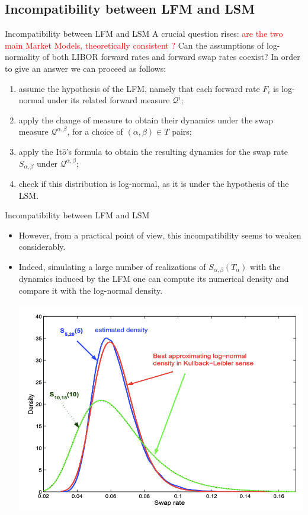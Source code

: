 \documentclass{beamer}
\begin{document}
\subsection{Incompatibility between LFM and LSM}
\begin{frame}{Incompatibility between LFM and LSM}
  A crucial question rises: \textcolor{red}{are the two main Market Models, theoretically consistent ?} 
  Can the assumptions of log-normality of both LIBOR forward rates and forward swap rates coexist? 
  \pause
  In order to give an answer we can proceed as follows:
  \begin{enumerate}
  \item<2-> assume the hypothesis of the LFM, namely that each forward rate $F_i$ is log-normal under its related forward measure $\mathcal{Q}^i$;
  \item<3-> apply the change of measure to obtain their dynamics under the swap measure $\mathcal{Q}^{\alpha,\beta}$, for a choice of $(\alpha,\beta) \in T$ pairs;
  \item<4-> apply the It$\hat{o}$’s formula to obtain the resulting dynamics for the swap rate $S_{\alpha,\beta}$ under $\mathcal{Q}^{\alpha,\beta}$;
  \item<5-> check if this distribution is log-normal, as it is under the hypothesis of the LSM.
  \end{enumerate}
\end{frame}

\begin{frame}{Incompatibility between LFM and LSM}
  \begin{itemize}
  \item<1-> However, from a practical point of view, this incompatibility seems to weaken considerably. 
  \item<2-> Indeed, simulating a large number of realizations of $S_{\alpha,\beta}(T_\alpha)$ with the dynamics induced by the LFM one can compute its numerical density and compare it with the log-normal density. 
  \begin{center}
  	\includegraphics[width=0.45\linewidth]{swap_rate_LFM}
  \end{center}
  \end{itemize}
\end{frame}
\end{document}
